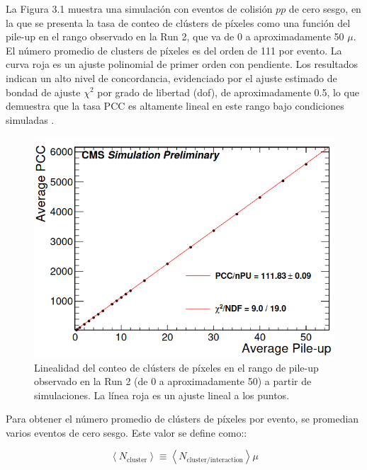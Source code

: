 La Figura 3.1 muestra una simulación con eventos de colisión $pp$ de cero sesgo, en la que se presenta la tasa de conteo de clústers de píxeles como una función del pile-up en el rango observado en la Run 2, que va de 0 a aproximadamente 50 $\mu$. El número promedio de clusters de píxeles es del orden de 111 por evento. La curva roja es un ajuste polinomial de primer orden con pendiente. Los resultados indican un alto nivel de concordancia, evidenciado por el ajuste estimado de bondad de ajuste $\chi^{2}$  por grado de libertad (dof), de aproximadamente 0.5, lo que demuestra que la tasa PCC es altamente lineal en este rango bajo condiciones simuladas \cite{ Phase2_Upgrade,lumi_precise_2015_2016}.

\begin{center}
  \begin{figure}[h!]
    \centering
    \includegraphics[scale=.35]{Chapter3/pileup_lineality.png} 
    \caption[Linealidad del PCC con pile-up]{ Linealidad del conteo de clústers de píxeles en el rango de pile-up observado en la Run 2 (de 0 a aproximadamente 50) a partir de simulaciones. La línea roja es un ajuste lineal a los puntos.}
    \label{pileup}
  \end{figure}
\end{center}

Para obtener el número promedio de clústers de píxeles por evento, se promedian varios eventos de cero sesgo. Este valor se define como::

\begin{equation}
\left < N_{\text{cluster}} \right > \equiv \left < N_{\text{cluster}/\text{interaction}} \right > \mu
\end{equation}

